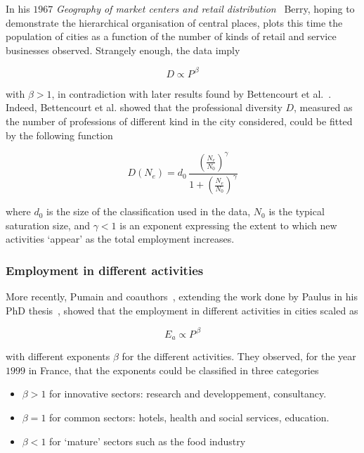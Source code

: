 In his $1967$ \emph{Geography of market centers and retail
distribution}~\cite{Berry:1967} Berry, hoping to demonstrate the hierarchical
organisation of central places, plots this time the population of cities as a
function of the number of kinds of retail and service businesses observed.
Strangely enough, the data imply

\begin{equation}
    D \propto P^{\, \beta}
\end{equation}

with $\beta > 1$, in contradiction with later results found by Bettencourt et
al.~\cite{Bettencourt:2014}.\\

Indeed, Bettencourt et al.\cite{Bettencourt:2014} showed that the professional
diversity $D$, measured as the number of professions of different kind in the
city considered, could be fitted by the following function

\begin{equation}
    D(N_e) = d_0\, \frac{\left(\frac{N_e}{N_0}\right)^\gamma}{1+\left(\frac{N_e}{N_0}\right)^\gamma}
\end{equation}

where $d_0$ is the size of the classification used in the data, $N_0$ is the
typical saturation size, and $\gamma < 1$ is an exponent expressing the extent to
which new activities `appear' as the total employment increases. 

\subsubsection{Employment in different activities}
\label{ssub:employment_in_different_activities}

More recently, Pumain and coauthors~\cite{Pumain:2006}, extending the work done
by Paulus in his PhD thesis~\cite{Paulus:2004}, showed that the
employment in different activities in cities scaled as

\begin{equation}
    E_a \propto P^{\,\beta}
\end{equation}

with different exponents $\beta$ for the different activities. They observed,
for the year $1999$ in France, that the exponents could be classified in three
categories

\begin{itemize}
    \item $\beta > 1$ for innovative sectors: research and developpement,
        consultancy.
    \item $\beta = 1$ for common sectors: hotels, health and social services,
        education.
    \item $\beta < 1$ for `mature' sectors such as the food industry
\end{itemize}

